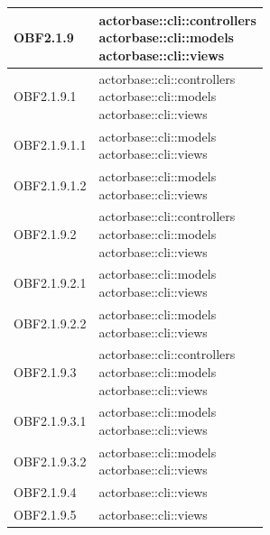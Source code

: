 \documentclass{scalatekids-article}
\begin{document}
\begin{longtable}[H]{|p{3.5cm}|p{7.5cm}|}
  \hline
  OBF2.1.9 & \multiLineCell[t]{actorbase::cli::controllers\\actorbase::cli::models\\actorbase::cli::views\\}\\
  \hline
  OBF2.1.9.1 & \multiLineCell[t]{actorbase::cli::controllers\\actorbase::cli::models\\actorbase::cli::views\\}\\
  \hline
  OBF2.1.9.1.1 & \multiLineCell[t]{actorbase::cli::models\\actorbase::cli::views\\}\\
  \hline
  OBF2.1.9.1.2 & \multiLineCell[t]{actorbase::cli::models\\actorbase::cli::views\\}\\
  \hline
  OBF2.1.9.2 & \multiLineCell[t]{actorbase::cli::controllers\\actorbase::cli::models\\actorbase::cli::views\\}\\
  \hline
  OBF2.1.9.2.1 & \multiLineCell[t]{actorbase::cli::models\\actorbase::cli::views\\}\\
  \hline
  OBF2.1.9.2.2 & \multiLineCell[t]{actorbase::cli::models\\actorbase::cli::views\\}\\
  \hline
  OBF2.1.9.3 & \multiLineCell[t]{actorbase::cli::controllers\\actorbase::cli::models\\actorbase::cli::views\\}\\
  \hline
  OBF2.1.9.3.1 & \multiLineCell[t]{actorbase::cli::models\\actorbase::cli::views\\}\\
  \hline
  OBF2.1.9.3.2 & \multiLineCell[t]{actorbase::cli::models\\actorbase::cli::views\\}\\
  \hline
  OBF2.1.9.4 & \multiLineCell[t]{actorbase::cli::views\\}\\
  \hline
  OBF2.1.9.5 & \multiLineCell[t]{actorbase::cli::views\\}\\

\end{longtable}
\end{document}
